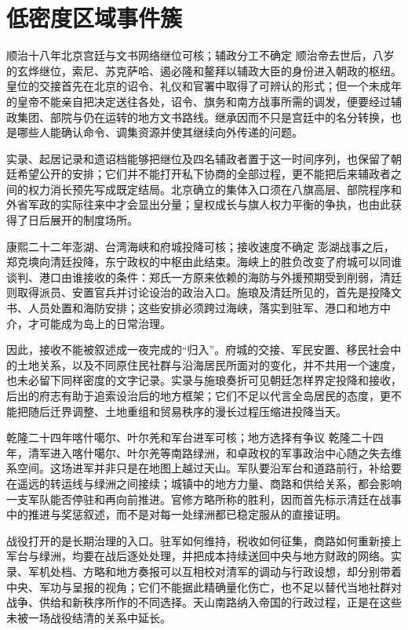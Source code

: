 \section{低密度区域事件簇}
\begin{event}{}{顺治十八年}{北京宫廷与文书网络}{继位可核；辅政分工不确定}
顺治帝去世后，八岁的玄烨继位，索尼、苏克萨哈、遏必隆和鳌拜以辅政大臣的身份进入朝政的枢纽。皇位的交接首先在北京的诏令、礼仪和官署中取得了可辨认的形式；但一个未成年的皇帝不能亲自把决定送往各处，诏令、旗务和南方战事所需的调发，便要经过辅政集团、部院与仍在运转的地方文书路线。继承因而不只是宫廷中的名分转换，也是哪些人能确认命令、调集资源并使其继续向外传递的问题。

实录、起居记录和遗诏档能够把继位及四名辅政者置于这一时间序列，也保留了朝廷希望公开的安排；它们并不能打开私下协商的全部过程，更不能把后来辅政者之间的权力消长预先写成既定结局。北京确立的集体入口须在八旗高层、部院程序和外省军政的实际往来中才会显出分量；皇权成长与旗人权力平衡的争执，也由此获得了日后展开的制度场所。
\end{event}
\begin{event}{}{康熙二十二年}{澎湖、台湾海峡和府城}{投降可核；接收速度不确定}
澎湖战事之后，郑克塽向清廷投降，东宁政权的中枢由此结束。海峡上的胜负改变了府城可以同谁谈判、港口由谁接收的条件：郑氏一方原来依赖的海防与外援预期受到削弱，清廷则取得派员、安置官兵并讨论设治的政治入口。施琅及清廷所见的，首先是投降文书、人员处置和海防安排；这些安排必须跨过海峡，落实到驻军、港口和地方中介，才可能成为岛上的日常治理。

因此，接收不能被叙述成一夜完成的“归入”。府城的交接、军民安置、移民社会中的土地关系，以及不同原住民社群与沿海居民所面对的变化，并不共用一个速度，也未必留下同样密度的文字记录。实录与施琅奏折可见朝廷怎样界定投降和接收，后出的府志有助于追索设治后的地方框架；它们不足以代言全岛居民的态度，更不能把随后迁界调整、土地重组和贸易秩序的漫长过程压缩进投降当天。
\end{event}
\begin{event}{}{乾隆二十四年}{喀什噶尔、叶尔羌和军台}{进军可核；地方选择有争议}
乾隆二十四年，清军进入喀什噶尔、叶尔羌等南路绿洲，和卓政权的军事政治中心随之失去维系空间。这场进军并非只是在地图上越过天山。军队要沿军台和道路前行，补给要在遥远的转运线与绿洲之间接续；城镇中的地方力量、商路和供给关系，都会影响一支军队能否停驻和再向前推进。官修方略所称的胜利，因而首先标示清廷在战事中的推进与奖惩叙述，而不是对每一处绿洲都已稳定服从的直接证明。

战役打开的是长期治理的入口。驻军如何维持，税收如何征集，商路如何重新接上军台与绿洲，均要在战后逐处处理，并把成本持续送回中央与地方财政的网络。实录、军机处档、方略和地方奏报可以互相校对清军的调动与行政设想，却分别带着中央、军功与呈报的视角；它们不能据此精确量化伤亡，也不足以替代当地社群对战争、供给和新秩序所作的不同选择。天山南路纳入帝国的行政过程，正是在这些未被一场战役结清的关系中延长。
\end{event}
